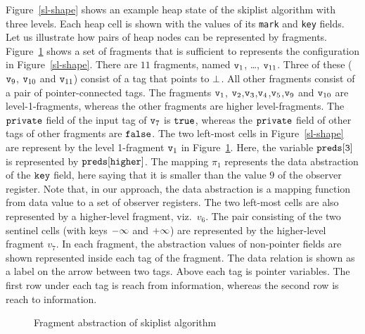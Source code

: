 Figure~\ref{sl-shape} shows an example heap state of the
skiplist algorithm with three levels. Each heap cell is shown with the values of its {\tt mark} and {\tt key} fields. %
Let us illustrate how pairs of heap nodes can be represented by fragments.
Figure~\ref{fig:skiplistabs} shows a set of fragments that is sufficient to
represents the configuration in Figure~\ref{sl-shape}. There are $11$ fragments, named $\mathtt{v}_1$, \ldots , $\mathtt{v}_{11}$. Three of
these ($\mathtt{v}_9$, $\mathtt{v}_{10}$ and $\mathtt{v}_{11}$) consist of a tag that points to $\bot$. All other fragments consist of a pair of pointer-connected tags. The fragments $\mathtt{v}_1$, $\mathtt{v}_2$,$\mathtt{v}_3$,$\mathtt{v}_4$,$\mathtt{v}_5$,$\mathtt{v}_9$ and $\mathtt{v}_{10}$ are level-1-fragments, whereas the other fragments are higher level-fragments. The $\tt private$ field of the input tag of $\mathtt{v}_7$ is $\tt true$, whereas the $\tt private$ field of other tags of other fragments are $\tt false$. The two left-most cells
in Figure~\ref{sl-shape} are represent by the level 1-fragment $\mathtt{v}_1$ in
Figure~\ref{fig:skiplistabs}. Here, the variable $\tt preds[3]$ is represented by $\tt preds[higher]$. The mapping $\pi_1$ represents the data abstraction of the $\tt key$ field, here saying that it is smaller than the value $9$ of the observer register. Note that, in our approach, the data abstraction is a mapping function from data value to a set of observer registers.
The two left-most cells are also represented by
a higher-level fragment, viz.\ $v_6$.
The pair consisting of the two sentinel cells (with keys $\tt -\infty$ and $\tt +\infty$) are represented by the higher-level fragment $v_7$. In each fragment, the abstraction values of non-pointer fields are shown represented inside each tag of the fragment. The data relation is shown as a label on the  arrow between two tags. Above each tag is pointer variables. The first row under each tag is reach from information, whereas the second row is reach to information.
 \begin{figure}
\center
	
\caption{Fragment abstraction of skiplist algorithm}
\label{fig:skiplistabs}
\vspace*{-0.6cm}
\end{figure} 





